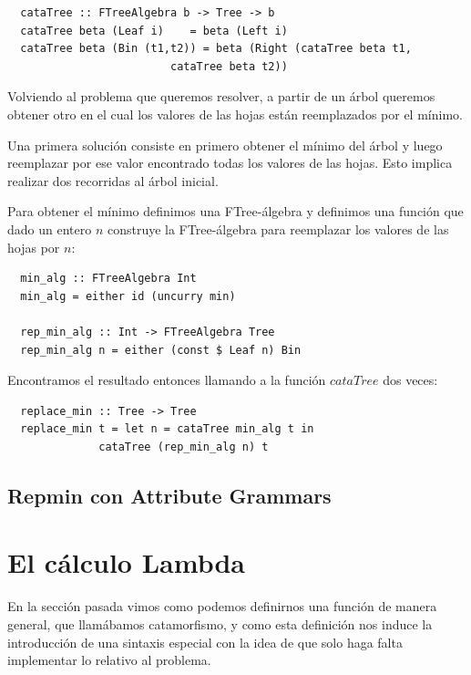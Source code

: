 \documentclass[a4paper,10pt]{article}
\begin{document}
\begin{lstlisting}
  cataTree :: FTreeAlgebra b -> Tree -> b
  cataTree beta (Leaf i)    = beta (Left i)
  cataTree beta (Bin (t1,t2)) = beta (Right (cataTree beta t1,
					     cataTree beta t2))
\end{lstlisting}


Volviendo al problema que queremos resolver, a partir de un árbol queremos obtener
otro en el cual los valores de las hojas están reemplazados por el mínimo.

Una primera solución consiste en primero obtener el mínimo del árbol y luego reemplazar
por ese valor encontrado todas los valores de las hojas. Esto implica realizar dos 
recorridas al árbol inicial.

Para obtener el mínimo definimos una FTree-álgebra y definimos una función
que dado un entero $n$ construye la FTree-álgebra para reemplazar
los valores de las hojas por $n$:

\begin{lstlisting}
  min_alg :: FTreeAlgebra Int
  min_alg = either id (uncurry min)

  rep_min_alg :: Int -> FTreeAlgebra Tree
  rep_min_alg n = either (const $ Leaf n) Bin
\end{lstlisting}

Encontramos el resultado entonces llamando a la función $cataTree$
dos veces:

\begin{lstlisting}
  replace_min :: Tree -> Tree
  replace_min t = let n = cataTree min_alg t in
		      cataTree (rep_min_alg n) t
\end{lstlisting}






\subsection{Repmin con Attribute Grammars}

\section{El cálculo Lambda}

En la sección pasada vimos como podemos definirnos una función de manera general,
que llamábamos catamorfismo, y como esta definición nos induce la introducción
de una sintaxis especial con la idea de que solo haga falta implementar lo relativo
al problema. 
\end{document}
